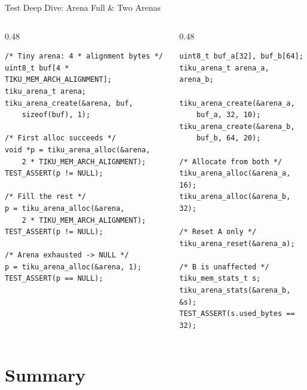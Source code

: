 \documentclass[aspectratio=169, 10pt]{beamer}
\begin{document}
\begin{frame}[fragile]{Test Deep Dive: Arena Full \& Two Arenas}
\begin{columns}[T]
\begin{column}{0.48\textwidth}
\begin{lstlisting}[style=cstyle, title={Arena full test}]
/* Tiny arena: 4 * alignment bytes */
uint8_t buf[4 * TIKU_MEM_ARCH_ALIGNMENT];
tiku_arena_t arena;
tiku_arena_create(&arena, buf,
    sizeof(buf), 1);

/* First alloc succeeds */
void *p = tiku_arena_alloc(&arena,
    2 * TIKU_MEM_ARCH_ALIGNMENT);
TEST_ASSERT(p != NULL);

/* Fill the rest */
p = tiku_arena_alloc(&arena,
    2 * TIKU_MEM_ARCH_ALIGNMENT);
TEST_ASSERT(p != NULL);

/* Arena exhausted -> NULL */
p = tiku_arena_alloc(&arena, 1);
TEST_ASSERT(p == NULL);
\end{lstlisting}
\end{column}

\begin{column}{0.48\textwidth}
\begin{lstlisting}[style=cstyle, title={Two independent arenas}]
uint8_t buf_a[32], buf_b[64];
tiku_arena_t arena_a, arena_b;

tiku_arena_create(&arena_a,
    buf_a, 32, 10);
tiku_arena_create(&arena_b,
    buf_b, 64, 20);

/* Allocate from both */
tiku_arena_alloc(&arena_a, 16);
tiku_arena_alloc(&arena_b, 32);

/* Reset A only */
tiku_arena_reset(&arena_a);

/* B is unaffected */
tiku_mem_stats_t s;
tiku_arena_stats(&arena_b, &s);
TEST_ASSERT(s.used_bytes == 32);
\end{lstlisting}
\end{column}
\end{columns}
\end{frame}

\section{Summary}
\end{document}
